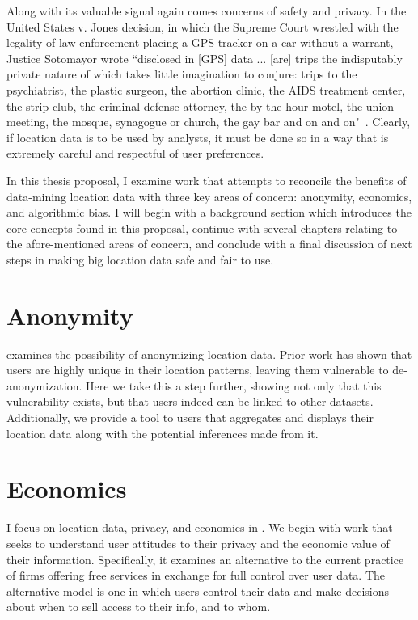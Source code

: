 Along with its valuable signal again comes concerns of safety and privacy.
In the United States v. Jones decision, in which the Supreme Court wrestled with the legality of law-enforcement placing a GPS tracker on a car without a warrant, Justice Sotomayor wrote 
``disclosed in [GPS] data ... [are] trips the indisputably private nature of which takes little imagination to conjure: trips to the psychiatrist, the plastic surgeon, the abortion clinic, the AIDS treatment center, the strip club, the criminal defense attorney, the by-the-hour motel, the union meeting, the mosque, synagogue or church, the gay bar and on and on"~\cite{jones2012us}.
Clearly, if location data is to be used by analysts, it must be done so in a way that is extremely careful and respectful of user preferences.

In this thesis proposal, I examine work that attempts to reconcile the benefits of data-mining location data with three key areas of concern: anonymity, economics, and algorithmic bias.
I will begin with a background section which introduces the core concepts found in this proposal, continue with several chapters relating to the afore-mentioned areas of concern, and conclude with a final discussion of next steps in making big location data safe and fair to use.

\section{Anonymity}
 examines the possibility of anonymizing location data. %
Prior work has shown that users are highly unique in their location patterns, leaving them vulnerable to de-anonymization.
Here we take this a step further, showing not only that this vulnerability exists, but that users indeed can be linked to other datasets.
Additionally, we provide a tool to users that aggregates and displays their location data along with the potential inferences made from it.

\section{Economics}
I focus on location data, privacy, and economics in .
We begin with work that seeks to understand user attitudes to their privacy and the economic value of their information.
Specifically, it examines an alternative to the current practice of firms offering free services in exchange for full control over user data.
The alternative model is one in which users control their data and make decisions about when to sell access to their info, and to whom.


